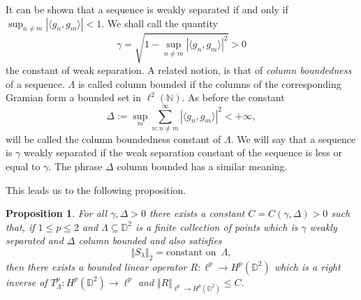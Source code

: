 \documentclass{amsart}
\numberwithin{equation}{section}
\newtheorem{prop}[thm]{Proposition}
\begin{document}
It can be shown \cite[Chapter 9]{AM02} that a sequence is weakly separated if and only if $\sup_{n\neq m} |\langle g_n, g_m  \rangle| < 1$. 
We shall call the quantity
\[
	\gamma = \sqrt{1-\sup_{n\neq m}|\langle g_n, g_m \rangle|^2} > 0
\]
 the constant of weak separation. 
A related notion,  is that of {\it column boundedness} of a sequence. 
$\Lambda $ is called column bounded if the columns of the corresponding Gramian form a bounded set in $\ell^2(\mathbb{N}).$ 
As before the constant   
\[ \Delta := \sup_m \sum_{n:n\neq m}^{\infty} |\langle g_n, g_m \rangle|^2 < + \infty, \]
will be called the column boundedness constant of $\Lambda.$ 
We will say that a sequence is $\gamma$ weakly separated if the weak separation constant of the sequence is less or equal to $\gamma $. The phrase $\Delta$ column bounded has a similar meaning.

This leads us to the following proposition.

\begin{prop}
\label{prop:bound_inv}
	For all $\gamma, \Delta>0$ there exists a constant $C=C(\gamma,\Delta)>0$ such that, if $1\le p \le2$ and $ \Lambda \subseteq \mathbb{D}^2$ is a finite collection of points which is  $\gamma$  weakly separated and $\Delta$ column bounded  and also satisfies 
	\[ \Vert S_\lambda \Vert_2 = \text{constant on} \,\,\, \Lambda, \]
	then there exists a bounded linear operator $R: \ell^p \to H^p(\mathbb{D}^2)	 $ which is a right inverse of $T_\Lambda^p: H^p(\mathbb{D}^2) \to \ell^p $ and $\Vert R\Vert_{\ell^p\to H^p(\mathbb{D}^2)}\leq C. $   
\end{prop}
\end{document}
